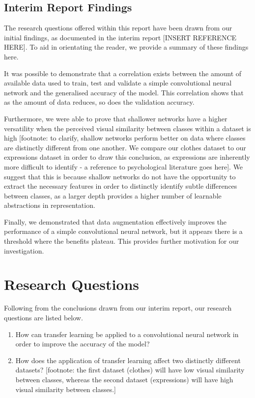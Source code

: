 \documentclass{article}
\begin{document}
\subsection{Interim Report Findings}
\label{sec:findings}

The research questions offered within this report have been drawn from our initial findings, as documented in the interim report [INSERT REFERENCE HERE]. To aid in orientating the reader, we provide a summary of these findings here.

It was possible to demonstrate that a correlation exists between the amount of available data used to train, test and validate a simple convolutional neural network and the generalised accuracy of the model. This correlation shows that as the amount of data reduces, so does the validation accuracy.

Furthermore, we were able to prove that shallower networks have a higher versatility when the perceived visual similarity between classes within a dataset is high [footnote: to clarify, shallow networks perform better on data where classes are distinctly different from one another. We compare our clothes dataset to our expressions dataset in order to draw this conclusion, as expressions are inherently more difficult to identify - a reference to psychological literature goes here]. We suggest that this is because shallow networks do not have the opportunity to extract the necessary features in order to distinctly identify subtle differences between classes, as a larger depth provides a higher number of learnable abstractions in representation.

Finally, we demonstrated that data augmentation effectively improves the performance of a simple convolutional neural network, but it appears there is a threshold where the benefits plateau. This provides further motivation for our investigation.

\section{Research Questions}
\label{sec:questions}

Following from the conclusions drawn from our interim report, our research questions are listed below.

\begin{enumerate}
  \item How can transfer learning be applied to a convolutional neural network in order to improve the accuracy of the model?
  \item How does the application of transfer learning affect two distinctly different datasets? [footnote: the first dataset (clothes) will have low visual similarity between classes, whereas the second dataset (expressions) will have high visual similarity between classes.]
\end{enumerate}
\end{document}
